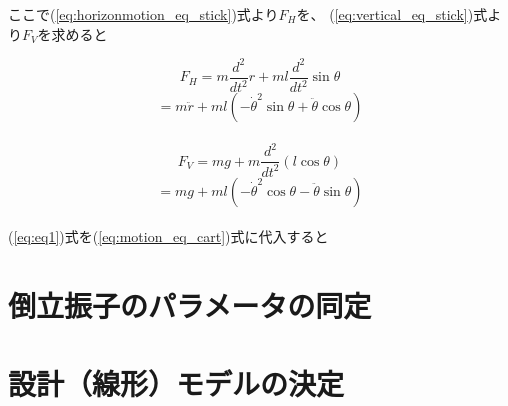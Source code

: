 	ここで(\ref{eq:horizonmotion_eq_stick})式より$F_{H}$を、
	(\ref{eq:vertical_eq_stick})式より$F_{V}$を求めると
	
	\[F_{H} = m\frac{d^{2}}{dt^{2}}r + ml\frac{d^{2}}{dt^{2}}\sin{\theta}\]
	\begin{equation}
		= m\ddot{r}+ml(-\dot{\theta}^{2}\sin{\theta}+\ddot{\theta}\cos{\theta})
		\label{eq:eq1}
	\end{equation}
	\\
	\[F_{V} = mg + m\frac{d^{2}}{dt^{2}}(l\cos{\theta})\]
	\begin{equation}
		= mg + ml(-\dot{\theta}^{2}\cos{\theta}-\ddot{\theta}\sin{\theta})
		\label{eq:eq2}
	\end{equation}
	\\
	(\ref{eq:eq1})式を(\ref{eq:motion_eq_cart})式に代入すると\\
	
\section{倒立振子のパラメータの同定}


\section{設計（線形）モデルの決定}